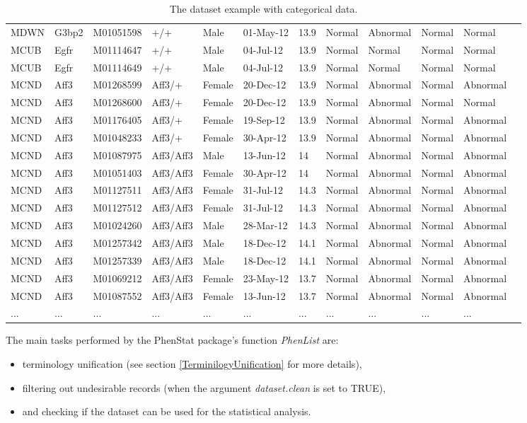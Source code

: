 \documentclass[12pt,a4paper]{article}
\begin{document}
\begin{table}
\begin{tabular}{| p{13mm} | p{15mm} | l | l | l | p{19mm}| p{12mm} |  p{16mm}  | p{17mm} | p{16mm} | p{17mm} | l |}
MDWN&G3bp2&M01051598&+/+&Male&01-May-12&13.9&Normal&Abnormal&Normal&Normal&\\
MCUB&Egfr&M01114647&+/+&Male&04-Jul-12&13.9&Normal&Normal&Normal&Normal&\\
MCUB&Egfr&M01114649&+/+&Male&04-Jul-12&13.9&Normal&Normal&Normal&Normal&\\
MCND&Aff3&M01268599&Aff3/+&Female&20-Dec-12&13.9&Normal&Abnormal&Normal&Abnormal&\\
MCND&Aff3&M01268600&Aff3/+&Female&20-Dec-12&13.9&Normal&Abnormal&Normal&Normal&\\
MCND&Aff3&M01176405&Aff3/+&Female&19-Sep-12&13.9&Normal&Abnormal&Normal&Abnormal&\\
MCND&Aff3&M01048233&Aff3/+&Female&30-Apr-12&13.9&Normal&Abnormal&Normal&Abnormal&\\
MCND&Aff3&M01087975&Aff3/Aff3&Male&13-Jun-12&14&Normal&Abnormal&Normal&Abnormal&\\
MCND&Aff3&M01051403&Aff3/Aff3&Female&30-Apr-12&14&Normal&Abnormal&Normal&Abnormal&\\
MCND&Aff3&M01127511&Aff3/Aff3&Female&31-Jul-12&14.3&Normal&Abnormal&Normal&Abnormal&\\
MCND&Aff3&M01127512&Aff3/Aff3&Female&31-Jul-12&14.3&Normal&Abnormal&Normal&Abnormal&\\
MCND&Aff3&M01024260&Aff3/Aff3&Male&28-Mar-12&14.3&Normal&Abnormal&Normal&Abnormal&\\
MCND&Aff3&M01257342&Aff3/Aff3&Male&18-Dec-12&14.1&Normal&Abnormal&Normal&Abnormal&\\
MCND&Aff3&M01257339&Aff3/Aff3&Male&18-Dec-12&14.1&Normal&Abnormal&Normal&Abnormal&\\
MCND&Aff3&M01069212&Aff3/Aff3&Female&23-May-12&13.7&Normal&Abnormal&Normal&Abnormal&\\
MCND&Aff3&M01087552&Aff3/Aff3&Female&13-Jun-12&13.7&Normal&Abnormal&Normal&Abnormal&\\
...&...&...&...&...&...&...&...&...&...&...&\\
\hline  
\end{tabular}
\caption{The dataset example with categorical data.}\label{table:02}
\end{table}


The main tasks performed by the PhenStat package's function \textit{PhenList} are:
\begin{itemize}
\item terminology unification (see section \ref{TerminilogyUnification} for more details),
\item filtering out undesirable records (when the argument \textit{dataset.clean} is set to TRUE),
\item and checking if the dataset can be used for the statistical analysis.
\end{itemize}
\end{document}
